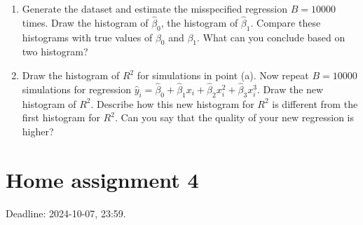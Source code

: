 \documentclass[12pt]{article}
\newcommand{\hb}{\hat\beta}
\begin{document}
\begin{enumerate}
\begin{enumerate}
    \item Generate the dataset and estimate the misspecified regression $B = 10000$ times. 
    Draw the histogram of $\hb_0$, the histogram of $\hb_1$. 
    Compare these histograms with true values of $\beta_0$ and $\beta_1$.
    What can you conclude based on two histogram?
    \item Draw the histogram of $R^2$ for simulations in point (a). 
    Now repeat $B = 10000$ simulations for regression $\hat y_i = \hb_0 + \hb_1 x_i + \hb_2 x_i^2 + \hb_3 x_i^3$.
    Draw the new histogram of $R^2$. 
    Describe how this new histogram for $R^2$ is different from the first histogram for $R^2$.
    Can you say that the quality of your new regression is higher?
\end{enumerate}

\end{enumerate}


\section*{Home assignment 4}

Deadline: 2024-10-07, 23:59.
\end{document}
